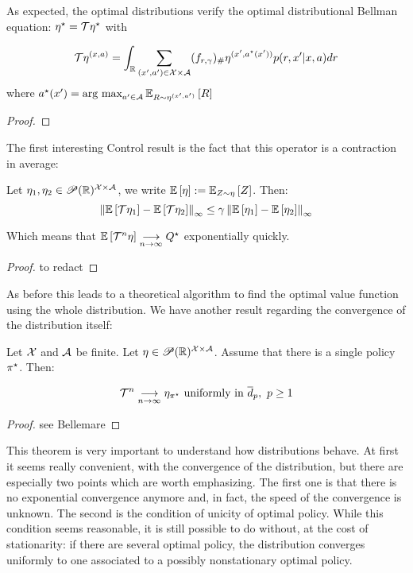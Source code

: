 As expected, the optimal distributions verify the optimal distributional Bellman equation: $\eta^{\star} = \mathcal{T}\eta^{\star}$ with 

\[
    \mathcal{T}\eta^{(x,a)} = \int_{\mathbb{R}} \sum_{(x^\prime,a^\prime)\in \mathcal{X} \times \mathcal{A}} (f_{r,\gamma})_\#\eta^{(x^\prime,a^{\star}(x^\prime))}p(r,x^\prime|x,a)dr
\]
where $a^{\star}(x^\prime) = \operatorname*{\mbox{arg max}}_{a^\prime \in \mathcal{A}} \mathbb{E}_{R \sim \eta^{(x^\prime, a^\prime)}}\left[ R \right]$
\begin{proof}
\end{proof}

The first interesting Control result is the fact that this operator is a contraction in average:

\begin{lemma}
    Let $\eta_1, \eta_2 \in \mathscr{P}(\mathbb{R})^{\mathcal{X}\times\mathcal{A}}$, we write $\mathbb{E}\left[ \eta \right]:= \mathbb{E}_{Z \sim \eta}\left[ Z \right]$. Then:
    \[ \left\lVert\mathbb{E}\left[ \mathcal{T}\eta_1 \right] - \mathbb{E}\left[ \mathcal{T}\eta_2 \right]\right\rVert_\infty \leq \gamma \left\lVert\mathbb{E}\left[ \eta_1 \right] - \mathbb{E}\left[ \eta_2 \right]\right\rVert_\infty \]  

    Which means that $\mathbb{E}\left[ \mathcal{T}^n \eta \right] \underset{n \rightarrow \infty}{\longrightarrow} Q^{\star}$ exponentially quickly.
\end{lemma}
\begin{proof}
    to redact
\end{proof}

As before this leads to a theoretical algorithm to find the optimal value function using the whole distribution. We have another result regarding the convergence of the distribution itself:

\begin{theorem}
    Let $\mathcal{X}$ and $\mathcal{A}$ be finite. Let $\eta \in \mathscr{P}(\mathbb{R})^{\mathcal{X}\times\mathcal{A}}$. Assume that there is a single policy $\pi^{\star}$. Then: 
    
    \[\mathcal{T}^n \underset{n \rightarrow \infty}{\longrightarrow} \eta_{\pi^{\star}} \text{ uniformly in } \overline{d}_p, \ p\geq1\]
\end{theorem}
\begin{proof}
    see Bellemare
\end{proof}

This theorem is very important to understand how distributions behave. At first it seems really convenient, with the convergence of the distribution, but there are especially two points which are worth emphasizing. The first one is that there is no exponential convergence anymore and, in fact, the speed of the convergence is unknown. The second is the condition of unicity of optimal policy. While this condition seems reasonable, it is still possible to do without, at the cost of stationarity: if there are several optimal policy, the distribution converges uniformly to one associated to a possibly nonstationary optimal policy.

